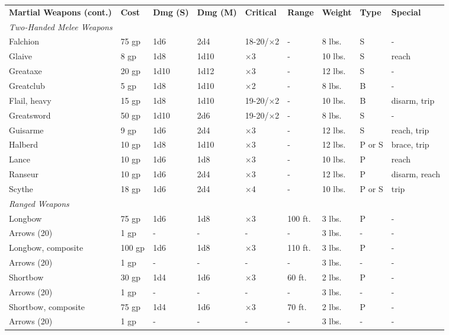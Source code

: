  \begin{table*}
  \sffamily
  \setlength{\tabcolsep}{1pt}

  \begin{tabular}{lllllllll}
\textbf{Martial Weapons (cont.)} & \textbf{Cost} & \textbf{Dmg (S)} & \textbf{Dmg (M)} & \textbf{Critical} & \textbf{Range} & \textbf{Weight} & \textbf{Type} & \textbf{Special}\\
 \textit{Two-Handed Melee Weapons} \\
 Falchion & 75 gp & 1d6 & 2d4 & 18-20/$\times$2 & - & 8 lbs. & S & - \\
 Glaive & 8 gp & 1d8 & 1d10 & $\times$3 & - & 10 lbs. & S & reach \\
 Greataxe & 20 gp & 1d10 & 1d12 & $\times$3 & - & 12 lbs. & S & - \\
 Greatclub & 5 gp & 1d8 & 1d10 & $\times$2 & - & 8 lbs. & B & - \\
 Flail, heavy & 15 gp & 1d8 & 1d10 & 19-20/$\times$2 & - & 10 lbs. & B & disarm, trip \\
 Greatsword & 50 gp & 1d10 & 2d6 & 19-20/$\times$2 & - & 8 lbs. & S & - \\
 Guisarme & 9 gp & 1d6  & 2d4 & $\times$3 & - & 12 lbs. & S & reach, trip \\
 Halberd & 10 gp & 1d8 & 1d10 & $\times$3 & - & 12 lbs. & P or S & brace, trip \\
 Lance & 10 gp & 1d6 & 1d8 & $\times$3 & - & 10 lbs. & P & reach \\
 Ranseur & 10 gp & 1d6 & 2d4 & $\times$3 & - & 12 lbs. & P & disarm, reach \\
 Scythe & 18 gp & 1d6 & 2d4 & $\times$4 & - & 10 lbs. & P or S & trip \\
 \textit{Ranged Weapons} \\
 Longbow & 75 gp & 1d6 & 1d8 & $\times$3 & 100 ft. & 3 lbs. & P & - \\
 Arrows (20) & 1 gp & - & - & - & - & 3 lbs. & - & - \\
 Longbow, composite & 100 gp & 1d6 & 1d8 & $\times$3 & 110 ft. & 3 lbs. & P & - \\
 Arrows (20) & 1 gp & - & - & - & - & 3 lbs. & - & - \\
 Shortbow & 30 gp & 1d4 & 1d6 & $\times$3 & 60 ft. & 2 lbs. & P & - \\
 Arrows (20) & 1 gp & - & - & - & - & 3 lbs. & - & - \\
 Shortbow, composite & 75 gp & 1d4 & 1d6 & $\times$3 & 70 ft. & 2 lbs. & P & - \\
 Arrows (20) & 1 gp & - & - & - & - & 3 lbs. & - & -\\

\end{tabular}
\end{table*}
